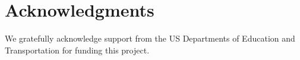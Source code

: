 \documentclass[12pt]{elsarticle}
\newif\ifappendix
\begin{document}
\section*{Acknowledgments}
We gratefully acknowledge support from the US Departments of Education and Transportation for funding this project.



\ifappendix
  \newpage
  \appendix
  \section{Largest Dependency Links ($d_{ij}$)}
  
  \section{Largest Multi-step Dependency Links ($t_{ij}$)}
  
  \section{Largest Out-degree Values ($\tau_i$)}
  
  \section{Largest In-degree Values ($\nu_j$)}
  
\fi
\end{document}
